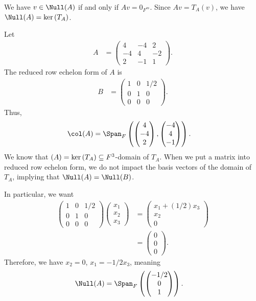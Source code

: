 \documentclass[10pt]{mypackage}
\begin{document}
We have $v\in \Null(A)$ if and only if $Av = 0_{F^m}$. Since $Av = T_A(v)$, we have $\Null(A) = \ker\left(T_A\right)$.
\begin{example}
  Let
  \begin{align*}
    A &= \begin{pmatrix}4 & -4 & 2 \\ -4 & 4 & -2 \\ 2 & -1 & 1\end{pmatrix}.
  \end{align*}
  The reduced row echelon form of $A$ is
  \begin{align*}
    B &= \begin{pmatrix}1 & 0 & 1/2 \\ 0 & 1 & 0 \\ 0 & 0 & 0\end{pmatrix}.
  \end{align*}
  Thus,
  \begin{align*}
    \col(A) &= \Span_{F}\left( \begin{pmatrix}4\\-4\\2\end{pmatrix}, \begin{pmatrix}-4\\4\\-1\end{pmatrix}\right).
  \end{align*}
  We know that $\null(A) = \ker\left(T_A\right) \subseteq F^{3}$-domain of $T_A$. When we put a matrix into reduced row echelon form, we do not impact the basis vectors of the domain of $T_A$, implying that $\Null(A) = \Null(B)$.\newline

  In particular, we want
  \begin{align*}
    \begin{pmatrix}1 & 0 & 1/2\\0 & 1 & 0 \\ 0 & 0 & 0\end{pmatrix} \begin{pmatrix}x_1\\x_2\\x_3\end{pmatrix} &= \begin{pmatrix}x_1 + \left(1/2\right) x_3\\x_2\\0\end{pmatrix}\\
                     &= \begin{pmatrix}0\\0\\0\end{pmatrix}.
  \end{align*}
  Therefore, we have $x_2 = 0$, $x_1 = -1/2 x_3$, meaning
  \begin{align*}
    \Null(A) &= \Span_{F}\left( \begin{pmatrix}-1/2\\0\\1\end{pmatrix}\right).
  \end{align*}
\end{example}
\end{document}
